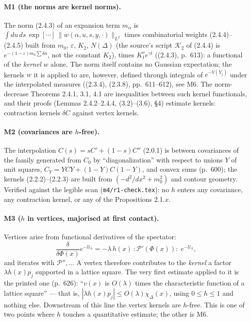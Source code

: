 \documentclass[11pt,a4paper]{article}
\theoremstyle{plain}
\theoremstyle{definition}
\theoremstyle{plain}
\theoremstyle{definition}
\begin{document}
\paragraph{M1 (the norms are kernel norms).}
The norm (2.4.3) of an expansion term $m_\alpha$ is
$\int du\,ds\,\exp[\cdots]\,\|w(\alpha,u,s,y,\cdot)\|_{L^2}$ times combinatorial weights
(2.4.4)--(2.4.5) built from $m_0$, $\varepsilon$, $K_2$, $N(\Delta)$ (the source's script
$\mathcal K_2$ of (2.4.4) is $e^{-(1-\varepsilon)m_0\sum\delta n}$, not the constant $K_2$),
times $K_1^{\nu}e^{\gamma t}$ ((2.4.3), p.~613): a functional of the \emph{kernel} $w$ alone. The norm itself contains
no Gaussian expectation; the kernels $w$ it is applied to are, however, defined through
integrals of $e^{-V(Y_j)}$ under the interpolated measures ((2.3.4), (2.3.8),
pp.~611--612), see M6. The norm-decrease Theorems 2.4.1, 3.1, 4.1 are inequalities between such kernel
functionals, and their proofs (Lemmas 2.4.2--2.4.4, (3.2)--(3.6), \S4) estimate kernels:
contraction kernels $\delta C$ against vertex kernels.

\paragraph{M2 (covariances are $h$-free).}
The interpolation $C(s)=sC'+(1-s)C''$ (2.0.1) is between covariances of the family
generated from $C_0$ by ``diagonalization'' with respect to unions $Y$ of unit squares,
$C_Y=YCY+(1-Y)C(1-Y)$, and convex sums (p.~600); the kernels (2.2.2)--(2.2.3) are built from $(-d^2/dx^2+m_0^2)$ and contour
geometry. Verified against the legible scan (\texttt{m4/r1-check.tex}): no $h$ enters
any covariance, any contraction kernel, or any of the Propositions 2.1.$x$.

\paragraph{M3 ($h$ in vertices, majorised at first contact).}
Vertices arise from functional derivatives of the spectator:
\[
  \frac{\delta}{\delta\Phi(x)}e^{-\mathcal U_h}
  =-\lambda\,h(x)\,{:}\mathscr P'(\Phi(x)){:}\;e^{-\mathcal U_h},
\]
and iterates with $\mathscr P'',\dots$ A vertex therefore contributes to the \emph{kernel}
a factor $\lambda h(x)p_j$ supported in a lattice square. The very first estimate applied
to it is the printed one (p.~626): ``$v(x)$ is $O(\lambda)$ times the characteristic
function of a lattice square'' --- that is, $|\lambda h(x)p_j|\le O(\lambda)\chi_\Delta(x)$,
using $0\le h\le1$ and nothing else. Downstream of this line the vertex kernels are
$h$-free. This is one of two points where $h$ touches a quantitative estimate; the other is
M6.
\end{document}
